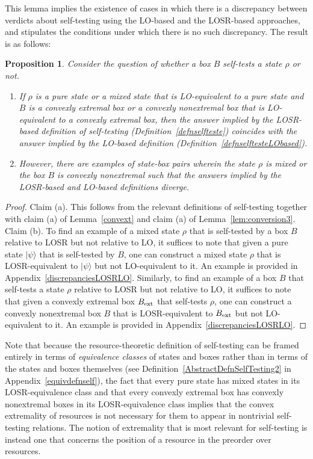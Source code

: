 \documentclass[12pt]{article}
\theoremstyle{plain}
\newtheorem{prop}[theo]{Proposition}
\theoremstyle{definition}
\begin{document}
This lemma implies the existence of cases in which there is a discrepancy between verdicts about self-testing using the LO-based and the LOSR-based approaches, and stipulates the conditions under which there is no such discrepancy.  The result is as follows:
\begin{prop}\label{prop:agree}
Consider the question of whether a box $B$ self-tests a state $\rho$ or not. 
\begin{enumerate}
\item[(a)] If $\rho$ is a pure state or a mixed state that is LO-equivalent to a pure state and $B$ is a convexly extremal box or a convexly nonextremal box that is  
LO-equivalent to a convexly extremal box, then the answer implied by the  LOSR-based definition of self-testing (Definition~\ref{defnselfteste}) coincides with the answer implied  by the LO-based definition (Definition~\ref{defnselftesteLObased}).  
\item[(b)] However, there are examples of state-box pairs wherein the state $\rho$ is mixed or the box $B$ is convexly nonextremal  such that the answers implied by the LOSR-based and LO-based definitions diverge.
\end{enumerate}
\end{prop}


\begin{proof}  Claim (a).  This follows  from the relevant definitions of self-testing together with claim (a) of Lemma~\ref{convext} and claim (a) of Lemma~\ref{lem:conversion3}.  
Claim (b). To find an example of a mixed state $\rho$ that is self-tested by a box $B$ relative to LOSR but not relative to LO, it suffices to note that given a pure state $|\psi\rangle$ that is self-tested by $B$, one can construct a mixed state $\rho$ that is LOSR-equivalent to $|\psi\rangle$ but not LO-equivalent to it.  An example is provided in Appendix~\ref{discrepanciesLOSRLO}. Similarly, to find an example of a box $B$ that self-tests a state $\rho$  relative to LOSR but not relative to LO, it suffices to note that given a convexly extremal box $B_{\rm ext}$ that self-tests $\rho$, one can construct a convexly nonextremal box $B$ that is LOSR-equivalent to $B_{\rm ext}$ but not LO-equivalent to it.   An example is provided in Appendix~\ref{discrepanciesLOSRLO}.
\end{proof}


 
 
Note that because the resource-theoretic definition of self-testing can be framed entirely in terms of {\em equivalence classes} of states and boxes rather than in terms of the states and boxes themselves (see Definition~\ref{AbstractDefnSelfTesting2} in Appendix~\ref{equivdefnself}), the fact that every pure state has mixed states in its LOSR-equivalence class and that every convexly extremal box has convexly nonextremal boxes in its LOSR-equivalence class implies that the convex extremality of resources is not necessary for them to appear in nontrivial self-testing relations. 
The notion of extremality that is most relevant for self-testing is instead one that concerns the position of a resource in the preorder over resources.   
\end{document}

